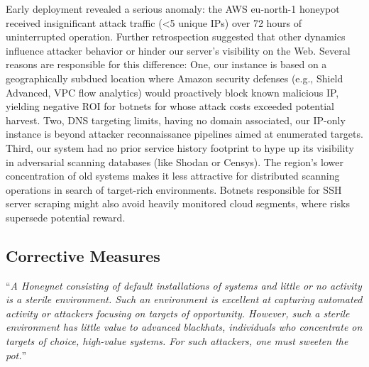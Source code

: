 \documentclass{cls/ULBreport}
\begin{document}
Early deployment revealed a serious anomaly: the AWS eu-north-1 honeypot received insignificant attack traffic (<5 unique IPs) over 72 hours of uninterrupted operation. Further retrospection suggested that other dynamics influence attacker behavior or hinder our server's visibility on the Web. Several reasons are responsible for this difference: One, our instance is based on a geographically subdued location where Amazon security defenses (e.g., Shield Advanced, VPC flow analytics) would proactively block known malicious IP, yielding negative ROI for botnets for whose attack costs exceeded potential harvest. Two, DNS targeting limits, having no domain associated, our IP-only instance is beyond attacker reconnaissance pipelines aimed at enumerated targets. Third, our system had no prior service history footprint to hype up its visibility in adversarial scanning databases (like Shodan or Censys). The region's lower concentration of old systems makes it less attractive for distributed scanning operations in search of target-rich environments. Botnets responsible for SSH server scraping might also avoid heavily monitored cloud segments, where risks supersede potential reward. 




\subsection{Corrective Measures}

\enquote{\textit{A Honeynet consisting of default installations of systems and little or no activity is a sterile
environment. Such an environment is excellent at capturing automated activity or attackers
focusing on targets of opportunity. However, such a sterile environment has little value to
advanced blackhats, individuals who concentrate on targets of choice, high-value systems.
For such attackers, one must sweeten the pot.}} \autocite[Ch.~11, p.~259]{spitzner2002honeypots}
\end{document}
